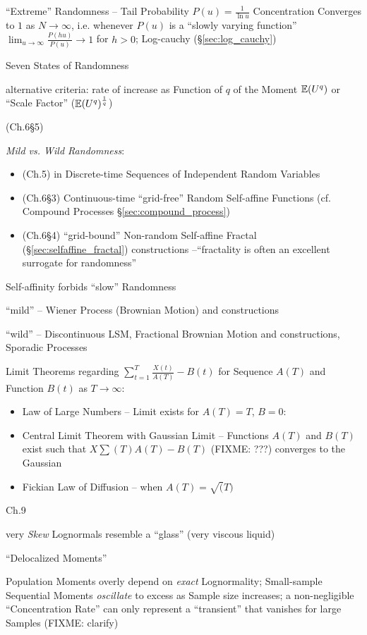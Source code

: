 ``Extreme'' Randomness -- Tail Probability $P(u) = \frac{1}{\ln u}$
Concentration Converges to $1$ as $N \to \infty$, i.e. whenever $P(u)$ is a
``slowly varying function'' $\lim_{u\to\infty}\frac{P(hu)}{P(u)} \to 1$ for
$h > 0$; Log-cauchy (\S\ref{sec:log_cauchy})

Seven States of Randomness

alternative criteria: rate of increase as Function of $q$ of the Moment
$\mathbb{E}(U^q)$ or ``Scale Factor'' ($\mathbb{E}(U^q)^\frac{1}{q}$)

(Ch.6\S5)

\emph{Mild vs. Wild Randomness}:
\begin{itemize}
  \item (Ch.5) in Discrete-time Sequences of Independent Random Variables
  \item (Ch.6\S3) Continuous-time ``grid-free'' Random Self-affine Functions
    (cf. Compound Processes \S\ref{sec:compound_process})
  \item (Ch.6\S4) ``grid-bound'' Non-random Self-affine Fractal
    (\S\ref{sec:selfaffine_fractal}) constructions --``fractality is often an
    excellent surrogate for randomness''
\end{itemize}

Self-affinity forbids ``slow'' Randomness

``mild'' -- Wiener Process (Brownian Motion) and constructions

``wild'' -- Discontinuous LSM, Fractional Brownian Motion and constructions,
Sporadic Processes

Limit Theorems regarding $\sum_{t=1}^T \frac{X(t)}{A(T)} - B(t)$ for Sequence
$A(T)$ and Function $B(t)$ as $T \to \infty$:
\begin{itemize}
  \item Law of Large Numbers -- Limit exists for $A(T) = T$, $B = 0$:
  \item Central Limit Theorem with Gaussian Limit -- Functions $A(T)$ and $B(T)$
    exist such that $X \sum(T)A(T) - B(T)$ (FIXME: ???) converges to the
    Gaussian
  \item Fickian Law of Diffusion -- when $A(T) = \sqrt(T)$
\end{itemize}

Ch.9

very \emph{Skew} Lognormals resemble a ``glass'' (very viscous liquid)

``Delocalized Moments''

Population Moments overly depend on \emph{exact} Lognormality; Small-sample
Sequential Moments \emph{oscillate} to excess as Sample size increases; a
non-negligible ``Concentration Rate'' can only represent a ``transient'' that
vanishes for large Samples (FIXME: clarify)

